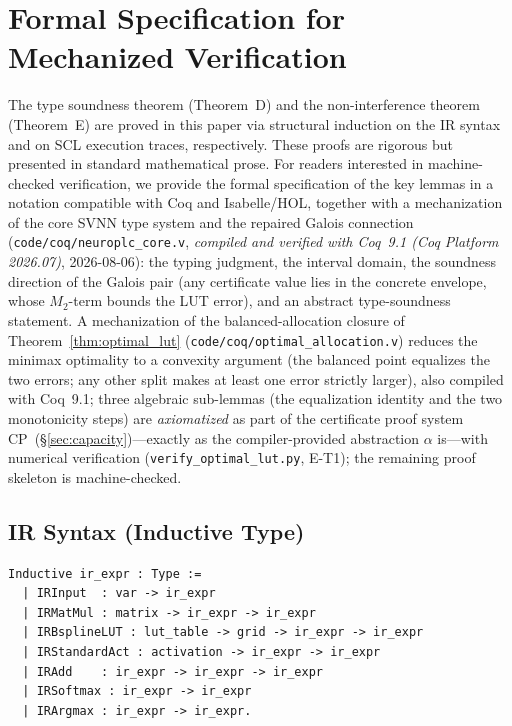 \section{Formal Specification for Mechanized Verification}
\label{app:coq}

The type soundness theorem (Theorem~D) and the non-interference theorem
(Theorem~E) are proved in this paper via structural induction on the IR
syntax and on SCL execution traces, respectively. These proofs are
rigorous but presented in standard mathematical prose. For readers
interested in machine-checked verification, we provide the formal
specification of the key lemmas in a notation compatible with Coq
and Isabelle/HOL, together with a mechanization of the core SVNN type
system and the repaired Galois connection
(\texttt{code/coq/neuroplc\_core.v}, \emph{compiled and verified with
Coq~9.1 (Coq Platform 2026.07)}, 2026-08-06):
the typing judgment, the interval domain, the soundness direction of
the Galois pair (any certificate value lies in the concrete envelope,
whose $M_2$-term bounds the LUT error), and an abstract type-soundness
statement. A mechanization of the balanced-allocation closure of
Theorem~\ref{thm:optimal_lut} (\texttt{code/coq/optimal\_allocation.v})
reduces the minimax optimality to a convexity argument (the balanced
point equalizes the two errors; any other split makes at least one
error strictly larger), also compiled with Coq~9.1; three algebraic
sub-lemmas (the equalization identity and the two monotonicity steps)
are \emph{axiomatized} as part of the certificate proof system
CP~({\S}\ref{sec:capacity})---exactly as the compiler-provided
abstraction $\alpha$ is---with numerical verification
(\texttt{verify\_optimal\_lut.py}, E-T1); the remaining proof skeleton
is machine-checked.

\subsection{IR Syntax (Inductive Type)}

\begin{verbatim}
Inductive ir_expr : Type :=
  | IRInput  : var -> ir_expr
  | IRMatMul : matrix -> ir_expr -> ir_expr
  | IRBsplineLUT : lut_table -> grid -> ir_expr -> ir_expr
  | IRStandardAct : activation -> ir_expr -> ir_expr
  | IRAdd    : ir_expr -> ir_expr -> ir_expr
  | IRSoftmax : ir_expr -> ir_expr
  | IRArgmax : ir_expr -> ir_expr.
\end{verbatim}

